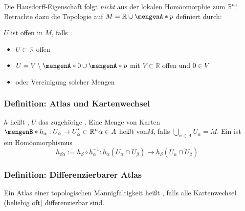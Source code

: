 Die Hausdorff-Eigenschaft folgt \emph{nicht} aus der lokalen Homöomorphie zum $\mathds{R}^n$! Betrachte dazu die Topologie auf $M = \mathds{R} \cup\set{p}$ definiert durch: 
\medskip\\ 
\begin{minipage}[c]{0.55\textwidth}
	$U$ ist offen in $M$, falls
	\begin{itemize}
		\item $U \subset \mathds{R}$ offen
		\item $U = V \setminus \set{0} \cup \set{p}$ mit $V \subset \mathds{R}$ offen und $0 \in V$
		\item oder Vereinigung solcher Mengen
	\end{itemize}
\end{minipage} \qquad 
\begin{minipage}[c]{0.35\textwidth}
	\captionsetup{type=figure, skip=2pt}
\end{minipage}

\subsubsection{Definition: Atlas und Kartenwechsel}
$h$ heißt , $U$ das zugehörige . Eine Menge von Karten $\set[h_\alpha : U_\alpha \to U'_\alpha \subset \mathds{R}^n]{\alpha \in A} $ heißt 
 von$M$, falls $\bigcup_{\alpha \in A} U_\alpha = M$. Ein  ist ein Homöomorphismus 
\[
	h_{\beta \alpha} := h_\beta \circ  h_\alpha ^{-1} : h_\alpha(U_\alpha \cap U_\beta) \to h_\beta( U_\alpha \cap U_\beta)  
\]

\subsubsection{Definition: Differenzierbarer Atlas} %
\label{ssub:123}
Ein Atlas einer topologischen Mannigfaltigkeit heißt , falls  alle Kartenwechsel (beliebig oft) differenzierbar sind.

